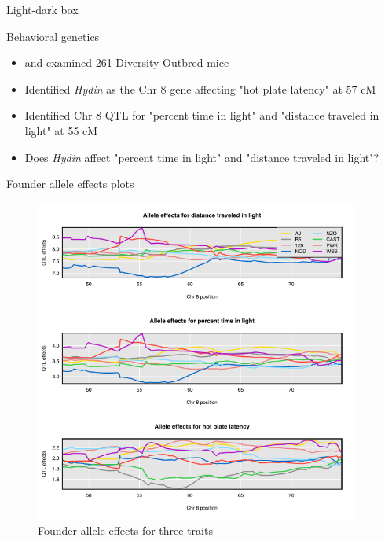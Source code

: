 \documentclass[final,hyperref={pdfpagelabels=false}]{beamer}
\begin{document}
\begin{frame}[t]
\begin{columns}[t]
\begin{column}{.465\textwidth}
\begin{block}{Light-dark box}
\end{block}
\begin{block}{Behavioral genetics}
\begin{itemize}
\item \cite{logan2013high} and \cite{recla2014precise} examined 261 Diversity Outbred mice    
\item Identified \textit{Hydin} as the Chr 8 gene affecting "hot plate latency" at 57 cM    
\item Identified Chr 8 QTL for "percent time in light" and "distance traveled in light" at 55 cM    
\item Does \textit{Hydin} affect "percent time in light" and "distance traveled in light"?    
\end{itemize}

\end{block}




\begin{block}{Founder allele effects plots}
\begin{figure}
\includegraphics[width=0.5\linewidth]{coef_all3.png}
\caption{Founder allele effects for three traits \citep{macdonald2007joint}}
\end{figure}

\end{block}




\end{column} %

\begin{column}{.03\textwidth}\end{column} %
 

\end{columns}
\end{frame}
\end{document}
